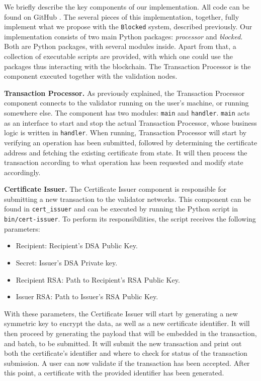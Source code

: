 We briefly describe the key components of our implementation. All code can be found on GitHub \cite{blocked}. The several pieces of this implementation, together, fully implement what we propose with the  \texttt{Blocked} system, described previously. Our implementation consists of two main Python packages: \textit{processor} and \textit{blocked}. Both are Python packages, with several modules inside. Apart from that, a collection of executable scripts are provided, with which one could use the packages thus interacting with the blockchain. The Transaction Processor is the component executed together with the validation nodes.

\textbf{Transaction Processor.} As previously explained, the Transaction Processor component connects to the validator running on the user's machine, or running somewhere else. The component has two modules: \texttt{main} and \texttt{handler}. \texttt{main} acts as an interface to start and stop the actual Transaction Processor, whose business logic is written in \texttt{handler}. When running, Transaction Processor will start by verifying an operation has been submitted, followed by determining the certificate address and fetching the existing certificate from state. It will then process the transaction according to what operation has been requested and modify state accordingly.

\textbf{Certificate Issuer.} The Certificate Issuer component is responsible for submitting a new transaction to the validator networks. This component can be found in \texttt{cert\_issuer} and can be executed by running the Python script in \texttt{bin/cert-issuer}. To perform its responsibilities, the script receives the following parameters:

\begin{itemize}
	\item Recipient: Recipient's DSA Public Key.
	\item Secret: Issuer's DSA Private key.
	\item Recipient RSA: Path to Recipient's RSA Public Key.
	\item Issuer RSA: Path to Issuer's RSA Public Key.
\end{itemize}

With these parameters, the Certificate Issuer will start by generating a new symmetric key to encrypt the data, as well as a new certificate identifier. It will then proceed by generating the payload that will be embedded in the transaction, and batch, to be submitted. It will submit the new transaction and print out both the certificate's identifier and where to check for status of the transaction submission. A user can now validate if the transaction has been accepted. After this point, a certificate with the provided identifier has been generated.

